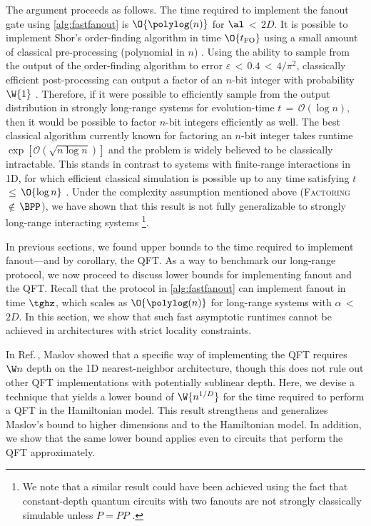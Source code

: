 The argument proceeds as follows.
The time required to implement the fanout gate using \cref{alg:fastfanout} is $\O{\polylog(n)}$ for $\al$\,$<$\,$2D$.
It is possible to implement Shor's order-finding algorithm in time $\O{t_\mathrm{FO}}$ using a small amount of classical pre-processing (polynomial in $n$) \cite{Cleve2000,Hoyer2005}.
Using the ability to sample from the output of the order-finding algorithm to error $\varepsilon$\,$<$\,$0.4$\,$<$\,$4/\pi^2$, classically efficient post-processing can output a factor of an $n$-bit integer with probability $\W{1}$ \cite{Shor1997}.
Therefore, if it were possible to efficiently sample from the output distribution in strongly long-range systems for evolution-time $t$\,$=$\,$\mathcal{O}(\log n)$, then it would be possible to factor $n$-bit integers efficiently as well.
The best classical algorithm currently known for factoring an $n$-bit integer takes runtime $\exp[\mathcal{O}(\sqrt{n \log n})]$ \cite{Lenstra1992} and the problem is widely believed to be classically intractable.
This stands in contrast to systems with finite-range interactions in 1D, for which efficient classical simulation is possible up to any time satisfying $t$\,$\leq$\,$\O{\log n}$ \cite{Osborne2006}.
Under the complexity assumption mentioned above (\textsc{Factoring} $\notin$\,$\BPP$), we have shown that this result is not fully generalizable to strongly long-range interacting systems \footnote{We note that a similar result could have been achieved using the fact that constant-depth quantum circuits with two fanouts are not strongly classically simulable unless $P = PP$ \cite{Takahashi2014}.}.



In previous sections, we found upper bounds to the time required to implement fanout---and by corollary, the QFT.
As a way to benchmark our long-range protocol, we now proceed to discuss lower bounds for implementing fanout and the QFT.
Recall that the protocol in \cref{alg:fastfanout} can implement fanout in time $\tghz$, which scales as $\O{\polylog(n)}$ for long-range systems with $\alpha$\,$<$\,$2D$.
In this section, we show that such fast asymptotic runtimes cannot be achieved in architectures with strict locality constraints.

In Ref.\,\cite{Maslov2007}, Maslov showed that a specific way of implementing the QFT requires $\W n$ depth on the 1D  nearest-neighbor architecture, though this does not rule out other QFT implementations with potentially sublinear depth.
Here, we devise a technique that yields a lower bound of $\W {n^{1/D}}$ for the time required to perform a QFT in the Hamiltonian model.
This result strengthens and generalizes Maslov's bound to higher dimensions and to the Hamiltonian model.
In addition, we show that the same lower bound applies even to circuits that perform the QFT approximately.

